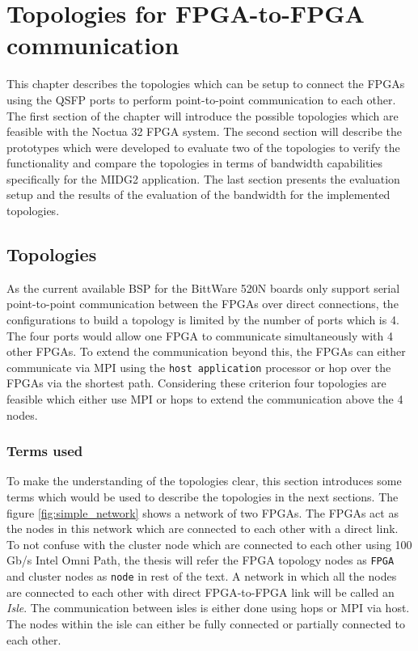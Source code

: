 \chapter{Topologies for FPGA-to-FPGA communication}
\label{cha:topologies}

This chapter describes the topologies which can be setup to
connect the FPGAs using the QSFP ports to perform point-to-point communication
to each other. The first section of the chapter will introduce the possible
topologies which are feasible with the Noctua 32 FPGA system. The second
section will describe the prototypes which were developed to evaluate two
of the topologies to verify the functionality and compare the topologies
in terms of bandwidth capabilities specifically for the MIDG2 application.
The last section presents the evaluation setup and the results of the evaluation
of the bandwidth for the implemented topologies.

\section{Topologies}

As the current available BSP for the BittWare 520N boards only support serial
point-to-point communication between the FPGAs over direct connections, the
configurations to build a topology is limited by the number of ports which is
4. The four ports would allow one FPGA to communicate simultaneously with 4
other FPGAs. To extend the communication beyond this, the FPGAs can either
communicate via MPI using the \texttt{host application} processor or hop over the FPGAs via the
shortest path. Considering these criterion four topologies are feasible which
either use MPI or hops to extend the communication above the 4 nodes.


\subsection*{Terms used}

To make the understanding of the topologies clear, this section introduces
some terms which would be used to describe the topologies in the next sections.
The figure \ref{fig:simple_network} shows a network of two FPGAs.
The FPGAs act as the nodes in this network which are connected to each other
with a direct link. To not confuse with the cluster node which are connected to
each other using 100 Gb/s Intel Omni Path, the thesis will refer
the FPGA topology nodes as \texttt{FPGA} and cluster nodes as \texttt{node} in rest of the text. A network in
which all the nodes are connected to each other with direct FPGA-to-FPGA link
will be called an \textit{Isle}. The communication between isles is either done
using hops or MPI via host. The nodes within the isle can either be fully
connected or partially connected to each other.

